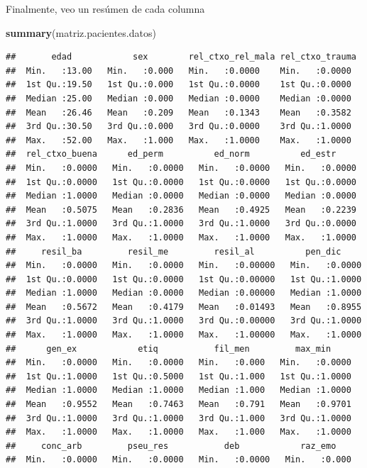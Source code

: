 \documentclass[]{article}
\newenvironment{Shaded}{\begin{snugshade}}{\end{snugshade}}
\newcommand{\KeywordTok}[1]{\textcolor[rgb]{0.13,0.29,0.53}{\textbf{#1}}}
\newcommand{\NormalTok}[1]{#1}
\begin{document}
Finalmente, veo un resúmen de cada columna

\begin{Shaded}
\begin{Highlighting}[]
\KeywordTok{summary}\NormalTok{(matriz.pacientes.datos)}
\end{Highlighting}
\end{Shaded}

\begin{verbatim}
##       edad            sex        rel_ctxo_rel_mala rel_ctxo_trauma 
##  Min.   :13.00   Min.   :0.000   Min.   :0.0000    Min.   :0.0000  
##  1st Qu.:19.50   1st Qu.:0.000   1st Qu.:0.0000    1st Qu.:0.0000  
##  Median :25.00   Median :0.000   Median :0.0000    Median :0.0000  
##  Mean   :26.46   Mean   :0.209   Mean   :0.1343    Mean   :0.3582  
##  3rd Qu.:30.50   3rd Qu.:0.000   3rd Qu.:0.0000    3rd Qu.:1.0000  
##  Max.   :52.00   Max.   :1.000   Max.   :1.0000    Max.   :1.0000  
##  rel_ctxo_buena      ed_perm          ed_norm          ed_estr      
##  Min.   :0.0000   Min.   :0.0000   Min.   :0.0000   Min.   :0.0000  
##  1st Qu.:0.0000   1st Qu.:0.0000   1st Qu.:0.0000   1st Qu.:0.0000  
##  Median :1.0000   Median :0.0000   Median :0.0000   Median :0.0000  
##  Mean   :0.5075   Mean   :0.2836   Mean   :0.4925   Mean   :0.2239  
##  3rd Qu.:1.0000   3rd Qu.:1.0000   3rd Qu.:1.0000   3rd Qu.:0.0000  
##  Max.   :1.0000   Max.   :1.0000   Max.   :1.0000   Max.   :1.0000  
##     resil_ba         resil_me         resil_al          pen_dic      
##  Min.   :0.0000   Min.   :0.0000   Min.   :0.00000   Min.   :0.0000  
##  1st Qu.:0.0000   1st Qu.:0.0000   1st Qu.:0.00000   1st Qu.:1.0000  
##  Median :1.0000   Median :0.0000   Median :0.00000   Median :1.0000  
##  Mean   :0.5672   Mean   :0.4179   Mean   :0.01493   Mean   :0.8955  
##  3rd Qu.:1.0000   3rd Qu.:1.0000   3rd Qu.:0.00000   3rd Qu.:1.0000  
##  Max.   :1.0000   Max.   :1.0000   Max.   :1.00000   Max.   :1.0000  
##      gen_ex            etiq           fil_men         max_min      
##  Min.   :0.0000   Min.   :0.0000   Min.   :0.000   Min.   :0.0000  
##  1st Qu.:1.0000   1st Qu.:0.5000   1st Qu.:1.000   1st Qu.:1.0000  
##  Median :1.0000   Median :1.0000   Median :1.000   Median :1.0000  
##  Mean   :0.9552   Mean   :0.7463   Mean   :0.791   Mean   :0.9701  
##  3rd Qu.:1.0000   3rd Qu.:1.0000   3rd Qu.:1.000   3rd Qu.:1.0000  
##  Max.   :1.0000   Max.   :1.0000   Max.   :1.000   Max.   :1.0000  
##     conc_arb         pseu_res           deb            raz_emo     
##  Min.   :0.0000   Min.   :0.0000   Min.   :0.0000   Min.   :0.000  

\end{verbatim}
\end{document}

